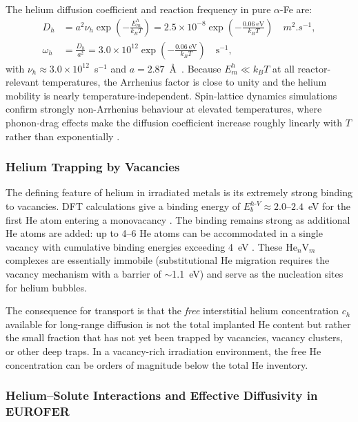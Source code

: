 \documentclass[pdflatex,sn-basic]{sn-jnl} %
\begin{document}
The helium diffusion coefficient and reaction frequency in pure $\alpha$-Fe are:
\begin{align}
    D_h &= a^2\nu_h\exp\!\left(-\frac{E_m^h}{k_BT}\right)
         = 2.5\times10^{-8}\exp\!\left(-\frac{0.06~\text{eV}}{k_BT}\right)
         \quad\si{m^2.s^{-1}}, \label{eq:Dh_explicit} \\[4pt]
    \omega_h &= \frac{D_h}{a^2}
              = 3.0\times10^{12}\exp\!\left(-\frac{0.06~\text{eV}}{k_BT}\right)
              \quad\text{s}^{-1}, \label{eq:omega_h_explicit}
\end{align}
with $\nu_h \approx 3.0\times10^{12}$~s$^{-1}$ and $a = 2.87$~\AA\
\citep{Becquart2007,Borodin2013}. Because $E_m^h \ll k_BT$ at all reactor-relevant
temperatures, the Arrhenius factor is close to unity and the helium mobility is
nearly temperature-independent. Spin-lattice dynamics simulations confirm
strongly non-Arrhenius behaviour at elevated temperatures, where phonon-drag
effects make the diffusion coefficient increase roughly linearly with $T$
rather than exponentially \citep{Ma2019_He}.

\subsubsection{Helium Trapping by Vacancies}

The defining feature of helium in irradiated metals is its extremely strong
binding to vacancies. DFT calculations give a binding energy of
$E_b^{h\text{-}V} \approx 2.0$--$2.4$~eV for the first He atom entering a
monovacancy \citep{Fu2005_He,Seletskaia2005,Becquart2007}. The binding remains
strong as additional He atoms are added: up to 4--6 He atoms can be
accommodated in a single vacancy with cumulative binding energies exceeding
4~eV \citep{Fu2005_He}. These He$_n$V$_m$ complexes are essentially immobile
(substitutional He migration requires the vacancy mechanism with a barrier of
$\sim$1.1~eV) and serve as the nucleation sites for helium bubbles.

The consequence for transport is that the \emph{free} interstitial helium
concentration $c_h$ available for long-range diffusion is not the total
implanted He content but rather the small fraction that has not yet been
trapped by vacancies, vacancy clusters, or other deep traps. In a
vacancy-rich irradiation environment, the free He concentration can be orders
of magnitude below the total He inventory.

\subsubsection{Helium--Solute Interactions and Effective Diffusivity in EUROFER}
\end{document}
